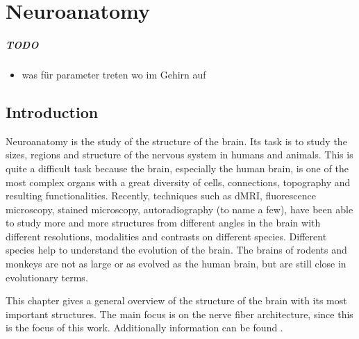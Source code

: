 \setcounter{chapter}{1}
\chapter{Neuroanatomy}
\label{chap:neuro}
% 
% 

\paragraph{TODO}
\begin{itemize}
    \item was für parameter treten wo im Gehirn auf
\end{itemize}

%
\section{Introduction}
% 
Neuroanatomy is the study of the structure of the brain.
Its task is to study the sizes, regions and structure of the nervous system in humans and animals.
This is quite a difficult task because the brain, especially the human brain, is one of the most complex organs with a great diversity of cells, connections, topography and resulting functionalities.
Recently, techniques such as \ac{dMRI}, fluorescence microscopy, stained microscopy, autoradiography (to name a few), have been able to study more and more structures from different angles in the brain with different resolutions, modalities and contrasts on different species.
Different species help to understand the evolution of the brain. The brains of rodents and monkeys are not as large or as evolved as the human brain, but are still close in evolutionary terms.
\par
% 
This chapter gives a general overview of the structure of the brain with its most important structures.
The main focus is on the nerve fiber architecture, since this is the focus of this work.
Additionally information can be found \eg{} \dummy{}.
%
% 
% 
